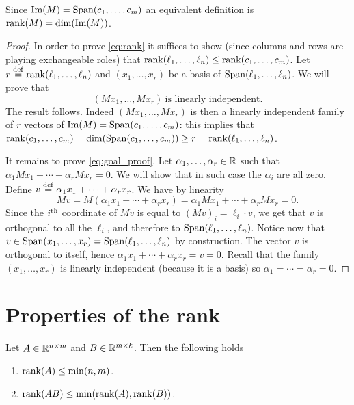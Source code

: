 \documentclass[11pt,nocut]{article}
\begin{document}
Since ${{\rm Im}}(M) = {{\rm Span}}(c_1, \dots, c_m)$ an equivalent definition is ${{\rm rank}}(M) = {{\rm dim}}({{\rm Im}}(M))$.
\\

\begin{proof}
	In order to prove \eqref{eq:rank} it suffices to show (since columns and rows are playing exchangeable roles) that ${{\rm rank}}(\ell_1, \dots, \ell_n) \leq {{\rm rank}}(c_1, \dots, c_m)$.
	Let $r \overset{\rm def}{=} {{\rm rank}}(\ell_1, \dots, \ell_n)$ and $(x_1, \dots, x_r)$ be a basis of ${{\rm Span}}(\ell_1, \dots, \ell_n)$. We will prove that
	\begin{equation}\label{eq:goal_proof}
	(M x_1, \dots, M x_r) \ \text{is linearly independent}.
	\end{equation}
	The result follows. Indeed $(M x_1, \dots, M x_r)$ is then a linearly independent family of $r$ vectors of ${{\rm Im}}(M) = {{\rm Span}}(c_1, \dots, c_m)$: this implies that ${{\rm rank}}(c_1, \dots, c_m) = {{\rm dim}}({{\rm Span}}(c_1, \dots, c_m)) \geq r = {{\rm rank}}(\ell_1, \dots, \ell_n)$.

	It remains to prove \eqref{eq:goal_proof}. Let $\alpha_1, \dots, \alpha_r \in \mathbb{R}$ such that $\alpha_1 M x_1 + \cdots + \alpha_r M x_r = 0$. We will show that in such case the $\alpha_i$ are all zero. Define $v \overset{\rm def}{=} \alpha_1 x_1 + \cdots + \alpha_r x_r$. We have by linearity
	$$
	M v = M (\alpha_1 x_1 + \cdots + \alpha_r x_r) = \alpha_1 M x_1 + \cdots + \alpha_r M x_r = 0.
	$$
	Since the $i^{\rm th}$ coordinate of $Mv$ is equal to $(Mv)_i = \ell_i \cdot v$, we get that $v$ is orthogonal to all the $\ell_i$, and therefore to ${{\rm Span}}(\ell_1, \dots, \ell_n)$. Notice now that $v \in {{\rm Span}}(x_1, \dots, x_r) = {{\rm Span}}(\ell_1, \dots, \ell_n)$ by construction. The vector $v$ is orthogonal to itself, hence $\alpha_1 x_1 + \cdots + \alpha_r x_r = v= 0$. Recall that the family $(x_1, \dots, x_r)$ is linearly independent (because it is a basis) so $\alpha_1 = \cdots = \alpha_r = 0$.
\end{proof}

\section{Properties of the rank}

\begin{proposition}
	Let $A \in \mathbb{R}^{n \times m}$ and $B \in \mathbb{R}^{m \times k}$. Then the following holds
	\begin{enumerate}[label=(\roman*)]
		\item ${{\rm rank}}(A) \leq \min(n,m)$.
		\item ${{\rm rank}}(AB) \leq \min({{\rm rank}}(A),{{\rm rank}}(B))$.
	\end{enumerate}
\end{proposition}
\end{document}
